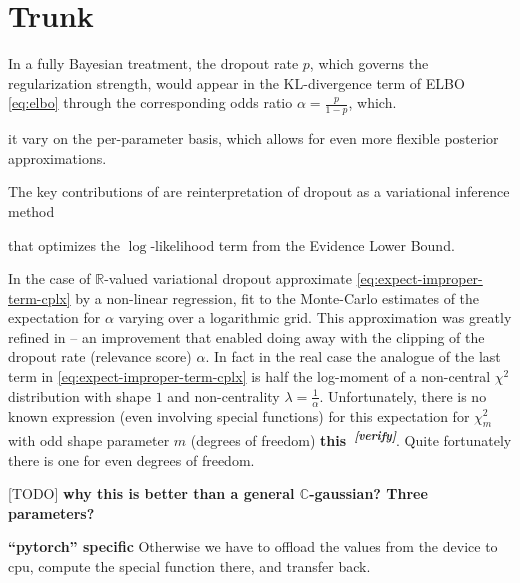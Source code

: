 \documentclass[a4paper,10pt]{article}
\newcommand{\real}{\mathbb{R}}
\newcommand{\cplx}{\mathbb{C}}
\newcommand{\important}[1]{\textbf{\color{red} #1}}
\newcommand{\attn}[2]{\textbf{\color{red} #2~\textsuperscript{\textit{[#1]}}}}
\newcommand{\verify}[1]{\attn{verify}{#1}}
\newcommand{\todo}[1]{{\color{blue} [TODO]} \important{#1}}
\begin{document}



\clearpage


\section{Trunk} %
\label{sec:trunk}



In a fully Bayesian treatment, the dropout rate $p$, which governs the regularization strength,
would appear in the KL-divergence term of ELBO \eqref{eq:elbo} through the corresponding odds 
ratio $
  \alpha = \tfrac{p}{1-p}
$, which.

it vary on the per-parameter basis, which allows for even more flexible posterior
approximations.

The key contributions of \cite{kingma_variational_2015} are reinterpretation of dropout
as a variational inference method

that optimizes the $\log$-likelihood term from the Evidence Lower Bound.




In the case of $\real$-valued variational dropout \cite{kingma_variational_2015} approximate
\eqref{eq:expect-improper-term-cplx} by a non-linear regression, fit to the Monte-Carlo estimates
of the expectation for $\alpha$ varying over a logarithmic grid. This approximation was greatly
refined in \cite{molchanov_variational_2017} -- an improvement that enabled doing away with
the clipping of the dropout rate (relevance score) $\alpha$. In fact in the real case the analogue
of the last term in \eqref{eq:expect-improper-term-cplx} is half the log-moment of a non-central
$\chi^2$ distribution with shape $1$ and non-centrality $\lambda = \tfrac1{\alpha}$. Unfortunately,
there is no known expression (even involving special functions) for this expectation for
$\chi^2_m$ with odd shape parameter $m$ (degrees of freedom) \verify{this}. Quite fortunately
there is one for even degrees of freedom.

\todo{why this is better than a general $\cplx$-gaussian? Three parameters?}

\important{``pytorch'' specific}
Otherwise we have to offload the values from the device to cpu, compute the special
function there, and transfer back.
\end{document}
